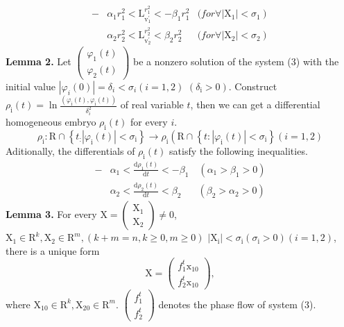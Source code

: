 \documentclass[11pt]{diazessay} %
\begin{document}
\begin{equation*}
	\begin{aligned}
		-&\alpha_{1} r_{1}^{2}<\mathrm{L}_{\mathrm{v}_{1}^{\prime}}^{r_{1}^{2}}<-\beta_{1} r_{1}^{2} & (for \left.\forall \left|\mathrm{X}_{1}\right|<\sigma_{1}\right)\\
		&\alpha_{2} r_{2}^{2}<\mathrm{L}_{\mathrm{v}_{2}^{\prime}}^{r_{2}^{2}}<\beta_{2} r_{2}^{2} & (for \left.\forall \left|\mathrm{X}_{2}\right|<\sigma_{2}\right)
	\end{aligned}
\end{equation*}
\vskip 8pt
\textbf{Lemma 2.} 
Let $\left(\begin{array}{l}\varphi_1(t) \\ \varphi_2(t)\end{array}\right)$ be a nonzero solution of the system (3) with the initial value $\left|\varphi_i(0)\right|=\delta_i<\sigma_i(i=1,2)$ $\left(\delta_{\mathrm{i}}>0\right)$. 
Construct $\rho_{\mathrm{i}}(t)=\ln \frac{\left(\varphi_{\mathrm{i}}(t), \varphi_{\mathrm{i}}(t)\right)}{\delta_i^2}$ of real variable $t$, then we can get a differential homogeneous embryo $\rho_{\mathrm{i}}(t)$ for every $i$.
$$\rho_{\mathrm{i}}: \mathrm{R} \cap\left\{t_{:}\left|\varphi_{\mathrm{i}}(t)\right|<\sigma_{\mathrm{i}}\right\} \rightarrow \rho_{\mathrm{i}}\left(\mathrm{R} \cap\left\{t:\left|\varphi_{\mathrm{i}}(t)\right|<\sigma_{\mathrm{i}}\right\}(i=1,2)\right.$$
Aditionally, the differentials of $\rho_{\mathrm{i}}(t)$ satisfy the following inequalities.
\begin{equation*}
	\begin{aligned}
	-&\alpha_1<\frac{\mathrm{d} \rho_1(t)}{\mathrm{d} t}<-\beta_1 \quad\left(\alpha_1>\beta_1>0\right)\\
    &\alpha_2<\frac{\mathrm{d} \rho_2(t)}{\mathrm{d} t}<\beta_2 \quad\;\,\;\left(\beta_2>\alpha_2>0\right)
    \end{aligned}
\end{equation*}
\vskip 8pt
\textbf{Lemma 3.} 
For every $\mathrm{X}=\left(\begin{array}{l}\mathrm{X}_1 \\ \mathrm{X}_2\end{array}\right) \neq 0$, $\mathrm{X}_1 \in \mathrm{R}^k, \mathrm{X}_2 \in \mathrm{R}^m , (k+m=n, k \geq 0, m \geq 0)$ $\left|\mathrm{X}_{\mathrm{i}}\right|<\sigma_{\mathrm{i}}\left(\sigma_{\mathrm{i}}>0\right)(i=1,2)$, there is a unique form
$$
\mathrm{X}=\left(\begin{array}{l}
f_1^t \mathrm{x}_{10} \\
f_2^t \mathrm{x}_{10}
\end{array}\right),
$$
where $\mathrm{X}_{10} \in \mathrm{R}^k, \mathrm{X}_{20} \in \mathrm{R}^m $. $\left(\begin{array}{l}f_1^t \\ f_2^{t}\end{array}\right)$ denotes the phase flow of system (3).
\end{document}
